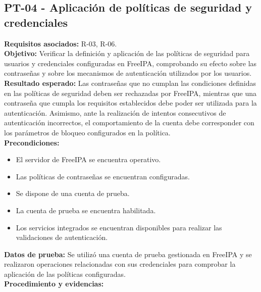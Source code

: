 \subsection{PT-04 - Aplicación de políticas de seguridad y credenciales}\label{subsec:pt04}
\textbf{Requisitos asociados:} R-03, R-06.\\
\textbf{Objetivo:} Verificar la definición y aplicación de las políticas de seguridad para usuarios y credenciales configuradas en FreeIPA, comprobando su efecto sobre las contraseñas y sobre los mecanismos de autenticación utilizados por los usuarios.\\
\textbf{Resultado esperado:} Las contraseñas que no cumplan las condiciones definidas en las políticas de seguridad deben ser rechazadas por FreeIPA, mientras que una contraseña que cumpla los requisitos establecidos debe poder ser utilizada para la autenticación.
Asimismo, ante la realización de intentos consecutivos de autenticación incorrectos, el comportamiento de la cuenta debe corresponder con los parámetros de bloqueo configurados en la política.\\
\textbf{Precondiciones:}
\begin{itemize}
	\item El servidor de FreeIPA se encuentra operativo.
	\item Las políticas de contraseñas se encuentran configuradas.
	\item Se dispone de una cuenta de prueba.
	\item La cuenta de prueba se encuentra habilitada.
	\item Los servicios integrados se encuentran disponibles para realizar las validaciones de autenticación.
\end{itemize}
\textbf{Datos de prueba:} Se utilizó una cuenta de prueba gestionada en FreeIPA y se realizaron operaciones relacionadas con sus credenciales para comprobar la aplicación de las políticas configuradas.\\
\textbf{Procedimiento y evidencias:}
